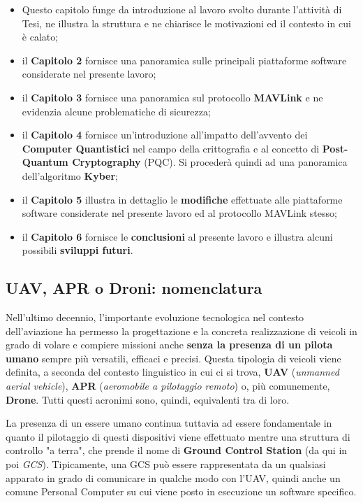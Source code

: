 \documentclass[a4paper, 12pt, oneside]{article}
\begin{document}
\begin{itemize}
    \item Questo capitolo funge da introduzione al lavoro svolto durante l'attività di Tesi, ne illustra la struttura e ne chiarisce le motivazioni ed il contesto in cui è calato;
    \item il \textbf{Capitolo 2} fornisce una panoramica sulle principali piattaforme software considerate nel presente lavoro;
    \item il \textbf{Capitolo 3} fornisce una panoramica sul protocollo \textbf{MAVLink} e ne evidenzia alcune problematiche di sicurezza;
    \item il \textbf{Capitolo 4} fornisce un'introduzione all'impatto dell'avvento dei \textbf{Computer Quantistici} nel campo della crittografia e al concetto di \textbf{Post-Quantum Cryptography} (PQC). Si procederà quindi ad una panoramica dell'algoritmo \textbf{Kyber};
    \item il \textbf{Capitolo 5} illustra in dettaglio le \textbf{modifiche} effettuate alle piattaforme software considerate nel presente lavoro ed al protocollo MAVLink stesso;
    \item il \textbf{Capitolo 6} fornisce le \textbf{conclusioni} al presente lavoro e illustra alcuni possibili \textbf{sviluppi futuri}.
\end{itemize}

\newpage


\subsection{UAV, APR o Droni: nomenclatura}
Nell'ultimo decennio, l'importante evoluzione tecnologica nel contesto dell'aviazione ha permesso la progettazione e la concreta realizzazione di veicoli in grado di volare e compiere missioni anche \textbf{senza la presenza di un pilota umano} sempre più versatili, efficaci e precisi. Questa tipologia di veicoli viene definita, a seconda del contesto linguistico in cui ci si trova, \textbf{UAV} (\textit{unmanned aerial vehicle}), \textbf{APR} (\textit{aeromobile a pilotaggio remoto}) o, più comunemente, \textbf{Drone}. Tutti questi acronimi sono, quindi, equivalenti tra di loro. 

La presenza di un essere umano continua tuttavia ad essere fondamentale in quanto il pilotaggio di questi dispositivi viene effettuato mentre una struttura di controllo "a terra", che prende il nome di \textbf{Ground Control Station} (da qui in poi \textit{GCS}). Tipicamente, una GCS può essere rappresentata da un qualsiasi apparato in grado di comunicare in qualche modo con l'UAV, quindi anche un comune Personal Computer su cui viene posto in esecuzione un software specifico.
\end{document}
